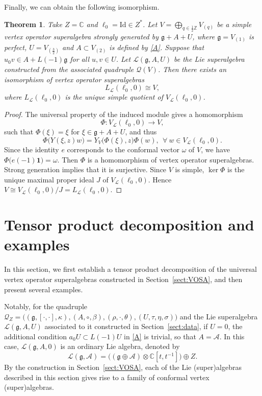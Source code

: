 \documentclass[12pt]{article}
\numberwithin{equation}{section}
\newtheorem{theorem}{Theorem}[section]
\theoremstyle{definition}
\theoremstyle{plain}
\newcommand{\bC}{\ensuremath{\mathbb{C}}}
\newcommand{\bZ}{\ensuremath{\mathbb{Z}}}
\newcommand{\fg}{\mathfrak{g}}
\newcommand{\Id}{\mathrm{Id }}
\newcommand{\cA}{\ensuremath{\mathcal{A}}}
\newcommand{\cQ}{\ensuremath{\mathcal{Q}}}
\newcommand{\cL}{\ensuremath{\mathcal{L}}}
\newcommand{\bone}{\mathbf{1 }}
\begin{document}
Finally, we can obtain the following isomorphism.
\begin{theorem}\label{thm:reconstruction}
    Take $Z=\bC$ and $\ell_0=\Id\in Z^*$. Let $V=\bigoplus_{q\in\frac12\bZ}V_{(q)}$ be a simple vertex operator superalgebra strongly generated by $\fg+A+U$, where $\fg=V_{(1)}$ is perfect, $U=V_{(\frac{3}{2})}$ and $A\subset V_{(2)}$ is defined by \eqref{A}. Suppose that $u_0v\in A+L(-1)\fg$ for all $u,v\in U$. Let $\cL(\fg,A,U)$ be the Lie superalgebra constructed from the associated quadruple $\cQ(V)$. Then there exists an isomorphism of vertex operator superalgebras
    \begin{equation*}
        L_{\cL}(\ell_0,0)\cong V,
    \end{equation*}
    where $L_\cL(\ell_0,0)$ is the unique simple quotient of $V_\cL(\ell_0,0)$.
\end{theorem}
\begin{proof}
    The universal property of the induced module gives a homomorphism
    \begin{equation*}
        \Phi:V_\cL(\ell_0,0)\longrightarrow V,
    \end{equation*}
    such that $\Phi(\xi)=\xi$ for $\xi\in\fg+A+U$, and thus
    \begin{equation*}
        \Phi\big(Y(\xi,z)w\big)=Y_V\big(\Phi(\xi),z\big)\Phi(w),\ \ \forall\ w\in V_{\cL}(\ell_0,0).
    \end{equation*}
    Since the identity $e$ corresponds to the conformal vector $\omega$ of $V$, we have $\Phi\big(e(-1)\bone\big)=\omega$. Then $\Phi$ is a homomorphism of vertex operator superalgebras. Strong generation implies that it is surjective. Since $V$ is simple, $\ker\Phi$ is the unique maximal proper ideal $J$ of $V_\cL(\ell_0,0)$. Hence $V\cong V_\cL(\ell_0,0)/J=L_\cL(\ell_0,0)$.
\end{proof}


\section{Tensor product decomposition and examples}\label{sect:examples}
\hspace{1.5em}In this section, we first establish a tensor product decomposition of the universal vertex operator superalgebras constructed in Section~\ref{sect:VOSA}, and then present several examples.

Notably, for the quadruple $\cQ_Z=\Big((\fg,[\cdot,\cdot],\kappa),(A,\circ,\beta),(\rho,\cdot,\theta),(U,\tau,\eta,\sigma)\Big)$ and the Lie superalgebra $\cL(\fg,A,U)$ associated to it constructed in Section~\ref{sect:data}, if $U=0$, the additional condition $a_0U\subset L(-1)U$ in \eqref{A} is trivial, so that $A=\cA$. In this case, $\cL(\fg,A,0)$ is an ordinary Lie algebra, denoted by
\begin{equation*}
    \cL(\fg,\cA)=\big((\fg\oplus\cA)\otimes\bC[t,t^{-1}]\big)\oplus Z.
\end{equation*}
By the construction in Section~\ref{sect:VOSA}, each of the Lie (super)algebras described in this section gives rise to a family of conformal vertex (super)algebras.
\end{document}
